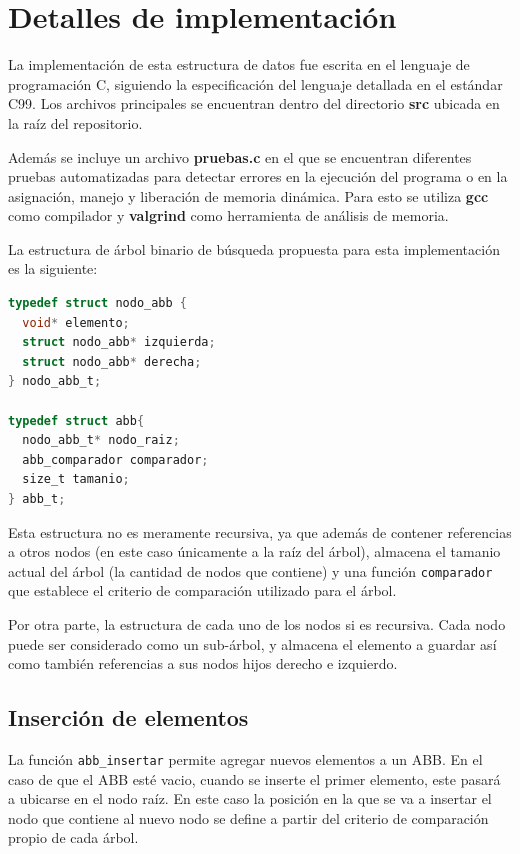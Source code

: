 \documentclass[titlepage,a4paper]{article}
\begin{document}
				 \section{Detalles de implementación}\label{sec:implementacion}

La implementación de esta estructura de datos fue escrita en el lenguaje de
programación C, siguiendo la especificación del lenguaje detallada en el
estándar C99. Los archivos principales se encuentran dentro del directorio
\textbf{src} ubicada en la raíz del repositorio. 

Además se incluye un archivo \textbf{pruebas.c} en el que se encuentran
diferentes pruebas automatizadas para detectar errores en la ejecución del
programa o en la asignación, manejo y liberación de memoria dinámica. Para esto
se utiliza \textbf{gcc} como compilador y \textbf{valgrind} como herramienta de
análisis de memoria.

La estructura de árbol binario de búsqueda propuesta para esta implementación
es la siguiente:

\begin{lstlisting}[language=C]
typedef struct nodo_abb {
  void* elemento;
  struct nodo_abb* izquierda;
  struct nodo_abb* derecha;
} nodo_abb_t;

typedef struct abb{
  nodo_abb_t* nodo_raiz;
  abb_comparador comparador;
  size_t tamanio;
} abb_t;
\end{lstlisting}

Esta estructura no es meramente recursiva, ya que además de contener
referencias a otros nodos (en este caso únicamente a la raíz del árbol),
almacena el tamanio actual del árbol (la cantidad de nodos que contiene) y una
función \lstinline{comparador} que establece el criterio de comparación
utilizado para el árbol.

Por otra parte, la estructura de cada uno de los nodos si es recursiva. Cada
nodo puede ser considerado como un sub-árbol, y almacena el elemento a guardar
así como también referencias a sus nodos hijos derecho e izquierdo.


											\subsection{Inserción de elementos}

La función \lstinline{abb_insertar} permite agregar nuevos elementos a un ABB.
En el caso de que el ABB esté vacio, cuando se inserte el primer elemento, este
pasará a ubicarse en el nodo raíz. En este caso la posición en la que se va a
insertar el nodo que contiene al nuevo nodo se define a partir del criterio de
comparación propio de cada árbol. 
\end{document}
